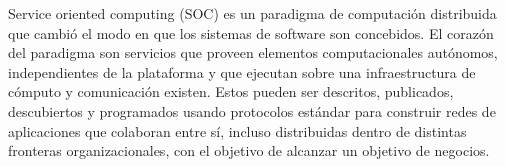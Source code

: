 Service oriented computing (SOC) es un paradigma de computación distribuida que cambió el modo en que los sistemas de software son concebidos. El corazón del paradigma son servicios que proveen elementos computacionales autónomos, independientes de la plataforma y que ejecutan sobre una infraestructura de cómputo y comunicación existen. Estos pueden ser descritos, publicados, descubiertos y programados usando protocolos estándar para construir redes de aplicaciones que colaboran entre sí, incluso distribuidas dentro de distintas fronteras organizacionales, con el objetivo de alcanzar un objetivo de negocios.

